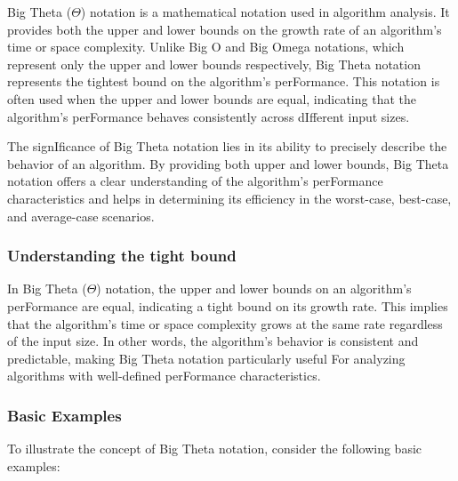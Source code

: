 \documentclass[12pt]{book} %
\begin{document}
Big Theta (\(\Theta\)) notation is a mathematical notation used in algorithm analysis. It provides both the upper and lower bounds on the growth rate of an algorithm's time or space complexity. Unlike Big O and Big Omega notations, which represent only the upper and lower bounds respectively, Big Theta notation represents the tightest bound on the algorithm's perFormance. This notation is often used when the upper and lower bounds are equal, indicating that the algorithm's perFormance behaves consistently across dIfferent input sizes.

The signIficance of Big Theta notation lies in its ability to precisely describe the behavior of an algorithm. By providing both upper and lower bounds, Big Theta notation offers a clear understanding of the algorithm's perFormance characteristics and helps in determining its efficiency in the worst-case, best-case, and average-case scenarios.

\subsubsection{Understanding the tight bound}

In Big Theta (\(\Theta\)) notation, the upper and lower bounds on an algorithm's perFormance are equal, indicating a tight bound on its growth rate. This implies that the algorithm's time or space complexity grows at the same rate regardless of the input size. In other words, the algorithm's behavior is consistent and predictable, making Big Theta notation particularly useful For analyzing algorithms with well-defined perFormance characteristics.


\subsubsection{Basic Examples}

To illustrate the concept of Big Theta notation, consider the following basic examples:
\end{document}
